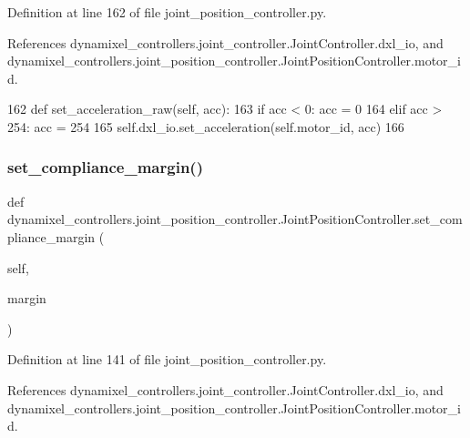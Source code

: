 Definition at line 162 of file joint\+\_\+position\+\_\+controller.\+py.



References dynamixel\+\_\+controllers.\+joint\+\_\+controller.\+Joint\+Controller.\+dxl\+\_\+io, and dynamixel\+\_\+controllers.\+joint\+\_\+position\+\_\+controller.\+Joint\+Position\+Controller.\+motor\+\_\+id.


\begin{DoxyCode}
162     \textcolor{keyword}{def }set\_acceleration\_raw(self, acc):
163         \textcolor{keywordflow}{if} acc < 0: acc = 0
164         \textcolor{keywordflow}{elif} acc > 254: acc = 254
165         self.dxl\_io.set\_acceleration(self.motor\_id, acc)
166 
\end{DoxyCode}
\mbox{\label{classdynamixel__controllers_1_1joint__position__controller_1_1_joint_position_controller_a5298e5e5fae5a02f0c3938d308c96544}} 
\subsubsection{\texorpdfstring{set\+\_\+compliance\+\_\+margin()}{set\_compliance\_margin()}}
{\footnotesize\ttfamily def dynamixel\+\_\+controllers.\+joint\+\_\+position\+\_\+controller.\+Joint\+Position\+Controller.\+set\+\_\+compliance\+\_\+margin (\begin{DoxyParamCaption}\item[{}]{self,  }\item[{}]{margin }\end{DoxyParamCaption})}



Definition at line 141 of file joint\+\_\+position\+\_\+controller.\+py.



References dynamixel\+\_\+controllers.\+joint\+\_\+controller.\+Joint\+Controller.\+dxl\+\_\+io, and dynamixel\+\_\+controllers.\+joint\+\_\+position\+\_\+controller.\+Joint\+Position\+Controller.\+motor\+\_\+id.


